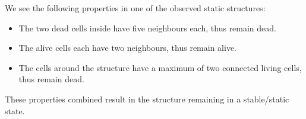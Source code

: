 \documentclass[a4paper]{article}
\begin{document}
\begin{enumerate}
	We see the following properties in one of the observed static structures:
	\begin{itemize}
	    \item The two dead cells inside have five neighbours each, thus remain dead.
	    \item The alive cells each have two neighbours, thus remain alive.
	    \item The cells around the structure have a maximum of two connected living cells, thus remain dead.
	\end{itemize}
	These properties combined result in the structure remaining in a stable/static state.
	
\end{enumerate}
\end{document}

